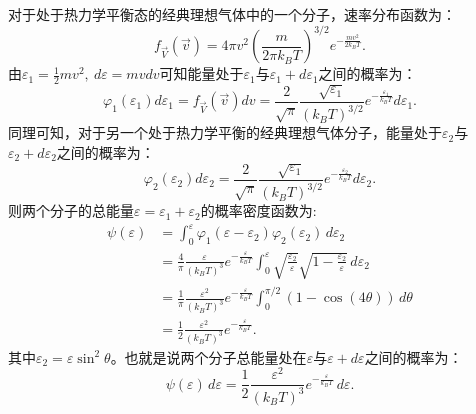 \documentclass[a4paper,12pt]{article}
\begin{document}
\subsection{}
对于处于热力学平衡态的经典理想气体中的一个分子，速率分布函数为：
\begin{equation}\nonumber
	f_{\vec{V}}(\vec{v}) = 4\pi v^2 \left( \frac{m}{2\pi k_B T} \right)^{3/2} e^{-\frac{m v^2}{2k_BT}}.
\end{equation}
由$\varepsilon_1 = \frac{1}{2}mv^2,~d\varepsilon = mvdv$可知能量处于$\varepsilon_1$与$\varepsilon_1+d\varepsilon_1$之间的概率为：
\begin{equation}\nonumber
	\varphi_1(\varepsilon_1) d\varepsilon_1 = f_{\vec{V}}(\vec{v}) dv = \frac{2}{\sqrt{\pi}}\frac{\sqrt{\varepsilon_1}}{(k_BT)^{3/2}} e^{-\frac{\varepsilon_1}{k_BT}} d\varepsilon_1.
\end{equation}
同理可知，对于另一个处于热力学平衡的经典理想气体分子，能量处于$\varepsilon_2$与$\varepsilon_2+d\varepsilon_2$之间的概率为：
\begin{equation}\nonumber
	\varphi_2(\varepsilon_2) d\varepsilon_2 = \frac{2}{\sqrt{\pi}}\frac{\sqrt{\varepsilon_1}}{(k_BT)^{3/2}} e^{-\frac{\varepsilon_2}{k_BT}} d\varepsilon_2.
\end{equation}
则两个分子的总能量$\varepsilon = \varepsilon_1 + \varepsilon_2$的概率密度函数为:
\begin{equation}\nonumber
\begin{aligned}
	\psi(\varepsilon) &= \int_{0}^{\varepsilon} \varphi_1(\varepsilon-\varepsilon_2) \varphi_2(\varepsilon_2) \,d\varepsilon_2 \\
	&= \frac{4}{\pi}\frac{\varepsilon}{(k_BT)^3} e^{-\frac{\varepsilon}{k_BT}} \int_0^{\varepsilon} \sqrt{\frac{\varepsilon_2}{\varepsilon}}\sqrt{1-\frac{\varepsilon_2}{\varepsilon}} \,d\varepsilon_2 \\
	&= \frac{1}{\pi}\frac{\varepsilon^2}{(k_BT)^3} e^{-\frac{\varepsilon}{k_BT}} \int_0^{\pi/2} (1-\cos(4\theta)) \,d\theta \\
	&= \frac{1}{2} \frac{\varepsilon^2}{(k_BT)^3} e^{-\frac{\varepsilon}{k_BT}}.
\end{aligned}
\end{equation}
其中$\varepsilon_2 = \varepsilon \sin^2\theta$。也就是说两个分子总能量处在$\varepsilon$与$\varepsilon+d\varepsilon$之间的概率为：
\begin{equation}\nonumber
	\psi(\varepsilon)\,d\varepsilon = \frac{1}{2} \frac{\varepsilon^2}{(k_BT)^3} e^{-\frac{\varepsilon}{k_BT}}\,d\varepsilon.
\end{equation}
\end{document}
